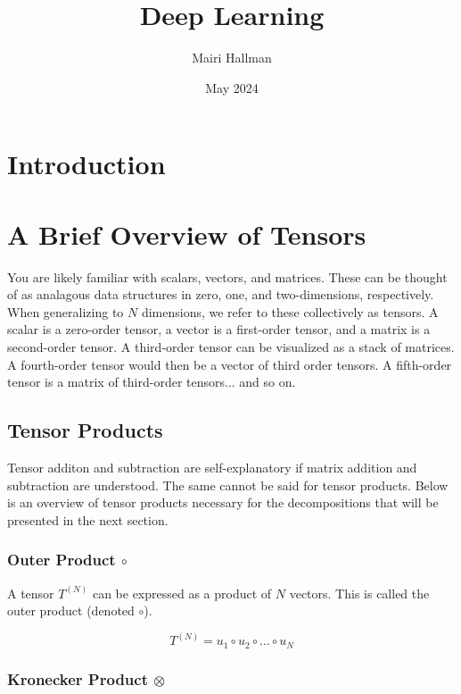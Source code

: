 \documentclass{article}
\title{Deep Learning}
\author{Mairi Hallman}
\date{May 2024}
\begin{document}
\maketitle

\section{Introduction}

\section{A Brief Overview of Tensors}

You are likely familiar with scalars, vectors, and matrices. These can be thought of as analagous data structures in zero, one, and two-dimensions, respectively. When generalizing to \(N\) dimensions, we refer to these collectively as tensors. A scalar is a zero-order tensor, a vector is a first-order tensor, and a matrix is a second-order tensor. A third-order tensor can be visualized as a stack of matrices. A fourth-order tensor would then be a vector of third order tensors. A fifth-order tensor is a matrix of third-order tensors... and so on.



\subsection{Tensor Products}

Tensor additon and subtraction are self-explanatory if matrix addition and subtraction are understood. The same cannot be said for tensor products. Below is an overview of tensor products necessary for the decompositions that will be presented in the next section.

\subsubsection{Outer Product \(\circ\)}

A tensor \(T^{(N)}\) can be expressed as a product of \(N\) vectors. This is called the outer product (denoted \(\circ\)).

\begin{equation}
    T^{(N)} = u_1 \circ u_2 \circ \dots \circ u_N
\end{equation}


\subsubsection{Kronecker Product \(\otimes\)}
\end{document}
